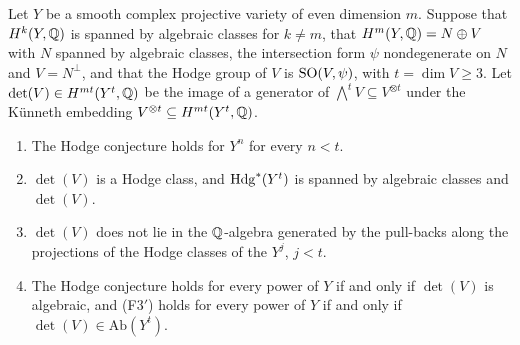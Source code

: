 \begin{proposition}
\label{prop:orthpowers}
Let $Y$ be a smooth complex projective variety of even dimension $m$. Suppose
that $H^{k}(Y,\mathbb{Q})$ is spanned by algebraic classes for $k\ne m$, that
$H^{m}(Y,\mathbb{Q})=N\oplus V$ with $N$ spanned by algebraic classes, the
intersection form $\psi$ nondegenerate on $N$ and $V=N^{\perp}$, and that the
Hodge group of $V$ is $\operatorname{SO}(V,\psi)$, with $t=\dim V\ge3$. Let
$\det(V)\in H^{mt}(Y^{t},\mathbb{Q})$ be the image of a generator of
$\bigwedge^{t}V\subseteq V^{\otimes t}$ under the K\"unneth embedding
$V^{\otimes t}\subseteq H^{mt}(Y^{t},\mathbb{Q})$.
\begin{enumerate}[label=\textup{(\roman*)},leftmargin=2.6em,itemsep=2pt]
\item The Hodge conjecture holds for $Y^{n}$ for every $n<t$.
\item $\det(V)$ is a Hodge class, and $\mathrm{Hdg}^{*}(Y^{t})$ is spanned by
  algebraic classes and $\det(V)$.
\item $\det(V)$ does not lie in the $\mathbb{Q}$-algebra generated by the pull-backs
  along the projections of the Hodge classes of the $Y^{j}$, $j<t$.
\item The Hodge conjecture holds for every power of $Y$ if and only if
  $\det(V)$ is algebraic, and \textup{(F3$'$)} holds for every power of $Y$
  if and only if $\det(V)\in\mathrm{Ab}(Y^{t})$.
\end{enumerate}
\end{proposition}

